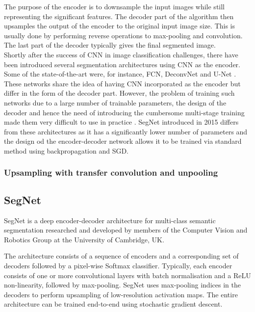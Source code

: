 The purpose of the encoder is to downsample the input images while still representing the significant features. The decoder part of the algorithm then upsamples the output of the encoder to the original input image size. This is usually done by performing reverse operations to max-pooling and convolution. The last part of the decoder typically gives the final segmented image. \\

Shortly after the success of CNN in image classification challenges, there have been introduced several segmentation architectures using CNN as the encoder. Some of the state-of-the-art were, for instance, FCN, DeconvNet and U-Net \cite{segnet}. These networks share the idea of having CNN incorporated as the encoder but differ in the form
of the decoder part. However, the problem of training such networks due to a large number of trainable parameters, the design of the decoder and hence the need of introducing the cumbersome multi-stage training made them very difficult to use in practice \cite{segnet}. SegNet \cite{segnet} introduced in 2015 differs from these architectures as it has a significantly lower number of parameters and the design od the encoder-decoder network allows it to be trained via standard method using backpropagation and SGD.

\subsubsection{Upsampling with transfer convolution and unpooling}

\subsection{SegNet}

SegNet is a deep encoder-decoder architecture for multi-class semantic segmentation researched and developed by members of the Computer Vision and Robotics Group at the University of Cambridge, UK. \cite{segnet_tut}

The architecture consists of a sequence of encoders and a corresponding set of decoders followed by a pixel-wise Softmax classifier. Typically, each encoder consists of one or more convolutional layers with batch normalisation and a ReLU non-linearity, followed by max-pooling. SegNet uses max-pooling indices in the decoders to perform upsampling of low-resolution activation maps. The entire architecture can be trained end-to-end using stochastic gradient descent. \cite{segnet_tut}

